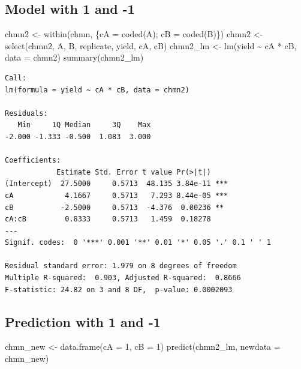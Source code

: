 \documentclass[
]{book}
\newenvironment{Shaded}{\begin{snugshade}}{\end{snugshade}}
\newcommand{\AttributeTok}[1]{\textcolor[rgb]{0.77,0.63,0.00}{#1}}
\newcommand{\DecValTok}[1]{\textcolor[rgb]{0.00,0.00,0.81}{#1}}
\newcommand{\FunctionTok}[1]{\textcolor[rgb]{0.00,0.00,0.00}{#1}}
\newcommand{\NormalTok}[1]{#1}
\newcommand{\OtherTok}[1]{\textcolor[rgb]{0.56,0.35,0.01}{#1}}
\newcommand{\SpecialCharTok}[1]{\textcolor[rgb]{0.00,0.00,0.00}{#1}}
\begin{document}
\hypertarget{model-with-1-and--1}{%
\subsection{Model with 1 and -1}\label{model-with-1-and--1}}

\begin{Shaded}
\begin{Highlighting}[]
\NormalTok{chmn2 }\OtherTok{\textless{}{-}} \FunctionTok{within}\NormalTok{(chmn, \{cA }\OtherTok{=} \FunctionTok{coded}\NormalTok{(A); cB }\OtherTok{=} \FunctionTok{coded}\NormalTok{(B)\})}
\NormalTok{chmn2 }\OtherTok{\textless{}{-}} \FunctionTok{select}\NormalTok{(chmn2, A, B, replicate, yield, cA, cB)}
\NormalTok{chmn2\_lm }\OtherTok{\textless{}{-}} \FunctionTok{lm}\NormalTok{(yield }\SpecialCharTok{\textasciitilde{}}\NormalTok{ cA }\SpecialCharTok{*}\NormalTok{ cB, }\AttributeTok{data =}\NormalTok{ chmn2)}
\FunctionTok{summary}\NormalTok{(chmn2\_lm)}
\end{Highlighting}
\end{Shaded}

\begin{verbatim}
Call:
lm(formula = yield ~ cA * cB, data = chmn2)

Residuals:
   Min     1Q Median     3Q    Max 
-2.000 -1.333 -0.500  1.083  3.000 

Coefficients:
            Estimate Std. Error t value Pr(>|t|)    
(Intercept)  27.5000     0.5713  48.135 3.84e-11 ***
cA            4.1667     0.5713   7.293 8.44e-05 ***
cB           -2.5000     0.5713  -4.376  0.00236 ** 
cA:cB         0.8333     0.5713   1.459  0.18278    
---
Signif. codes:  0 '***' 0.001 '**' 0.01 '*' 0.05 '.' 0.1 ' ' 1

Residual standard error: 1.979 on 8 degrees of freedom
Multiple R-squared:  0.903,	Adjusted R-squared:  0.8666 
F-statistic: 24.82 on 3 and 8 DF,  p-value: 0.0002093
\end{verbatim}

\hypertarget{prediction-with-1-and--1}{%
\subsection{Prediction with 1 and -1}\label{prediction-with-1-and--1}}

\begin{Shaded}
\begin{Highlighting}[]
\NormalTok{chmn\_new }\OtherTok{\textless{}{-}} \FunctionTok{data.frame}\NormalTok{(}\AttributeTok{cA =} \DecValTok{1}\NormalTok{, }\AttributeTok{cB =} \DecValTok{1}\NormalTok{)}
\FunctionTok{predict}\NormalTok{(chmn2\_lm, }\AttributeTok{newdata =}\NormalTok{ chmn\_new)}
\end{Highlighting}
\end{Shaded}
\end{document}
